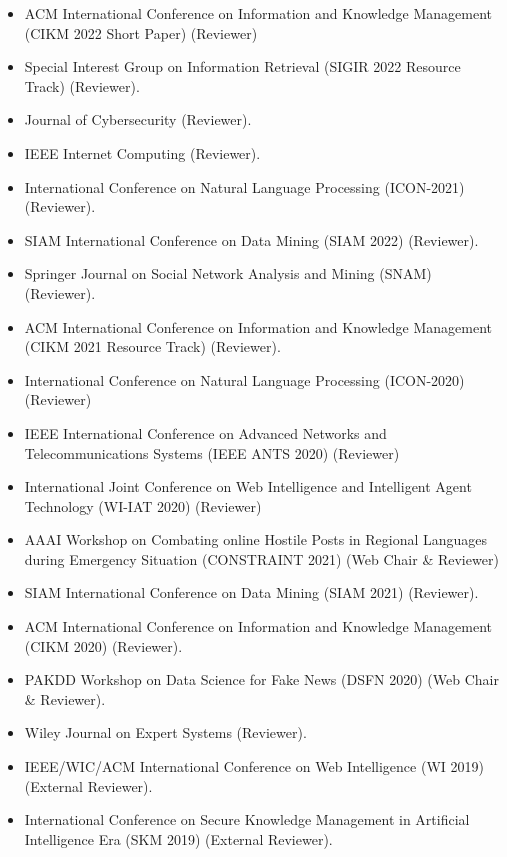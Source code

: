 \documentclass[margin, centered,lmodern]{res}
\begin{document}
\begin{resume}
\begin{itemize}[leftmargin=*]
\item ACM International Conference on Information and Knowledge Management (CIKM 2022 Short Paper) (Reviewer)
\item Special Interest Group on Information Retrieval (SIGIR 2022 Resource Track) (Reviewer).
\item Journal of Cybersecurity (Reviewer).
\item IEEE Internet Computing (Reviewer).
\item International Conference on Natural Language Processing (ICON-2021) (Reviewer).
\item SIAM International Conference on Data Mining (SIAM 2022) (Reviewer).
\item Springer Journal on Social Network Analysis and Mining (SNAM)   (Reviewer).
   \item ACM International Conference on Information and Knowledge Management (CIKM 2021 Resource Track) (Reviewer).
    \item International Conference on Natural Language Processing (ICON-2020) (Reviewer)
    \item IEEE International Conference on Advanced Networks and Telecommunications Systems (IEEE ANTS 2020) (Reviewer)
    \item International Joint Conference on Web Intelligence and Intelligent Agent Technology (WI-IAT 2020) (Reviewer)
	\item AAAI Workshop on Combating online Hostile Posts in Regional Languages during Emergency Situation (CONSTRAINT 2021) (Web Chair \& Reviewer)
	\item SIAM International Conference on Data Mining (SIAM 2021) (Reviewer).
	\item ACM International Conference on Information and Knowledge Management (CIKM 2020) (Reviewer).
	\item PAKDD Workshop on Data Science for Fake News (DSFN 2020) (Web Chair \& Reviewer).
	\item Wiley Journal on Expert Systems (Reviewer).
	\item IEEE/WIC/ACM International Conference on Web Intelligence (WI 2019) (External Reviewer).
	\item International Conference on Secure Knowledge Management in Artificial Intelligence Era (SKM 2019) (External Reviewer).
\end{itemize}


\end{resume}
\end{document}
